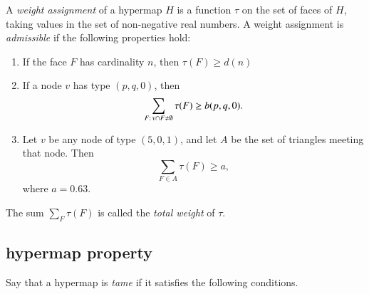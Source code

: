 \begin{definition}
%
A {\it weight assignment\/} of a hypermap $H$ is a function $\tau$ on
the set of faces of $H$, taking values in the set of non-negative
real numbers. A weight assignment is {\it admissible} if the
following properties hold:
%
\begin{enumerate}
  \item If the face $F$ has cardinality $n$, then
        $\tau(F) \ge d(n)$
  \item If a node $v$ has type $(p,q,0)$, then
        $$\sum_{F:\,v\cap F\ne\emptyset} \tau(F) \ge b{(p,q,0)}.$$
        \label{admissible:b}
  \item Let $v$ be any node of type $(5,0,1)$, and let $A$ be the set of
triangles meeting that node.
        Then
        $$\sum_{F\in A} \tau(F)
            \ge  a,$$
   where $a=0.63$.
        \label{definition:admissible:excess}
\end{enumerate}

The sum $\sum_F \tau(F)$ is called the {\it total weight} of $\tau$.
\end{definition}





\subsection{hypermap property}
\label{sec:graphproperty}

Say that a hypermap is {\it tame\/} if it satisfies the following
conditions.
%

